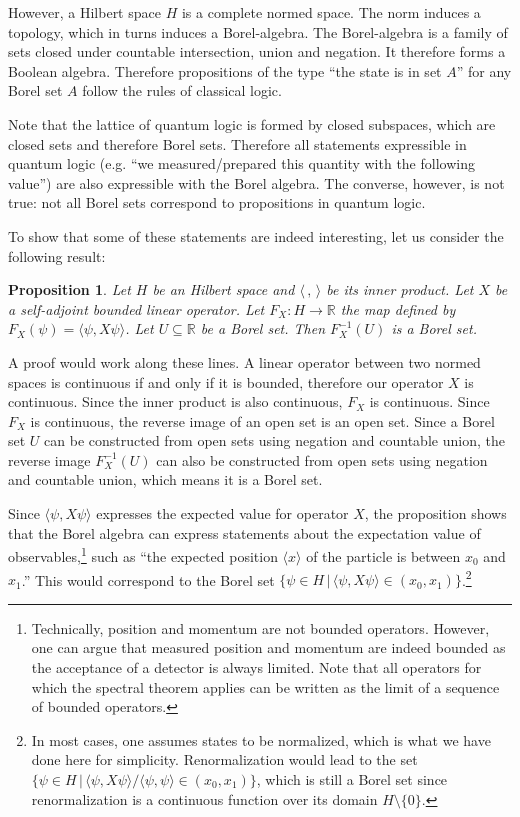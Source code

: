 \documentclass[10pt,twocolumn, nofootinbib]{revtex4-1}
\newtheorem{prop}[equation]{Proposition}
\begin{document}
However, a Hilbert space $H$ is a complete normed space. The norm induces a topology, which in turns induces a Borel-algebra. The Borel-algebra is a family of sets closed under countable intersection, union and negation. It therefore forms a Boolean algebra. Therefore propositions of the type ``the state is in set $A$'' for any Borel set $A$ follow the rules of classical logic.

Note that the lattice of quantum logic is formed by closed subspaces, which are closed sets and therefore Borel sets. Therefore all statements expressible in quantum logic (e.g. ``we measured/prepared this quantity with the following value'') are also expressible with the Borel algebra. The converse, however, is not true: not all Borel sets correspond to propositions in quantum logic.

To show that some of these statements are indeed interesting, let us consider the following result:
\begin{prop}
	Let $H$ be an Hilbert space and $\langle \, , \, \rangle$ be its inner product. Let $X$ be a self-adjoint bounded linear operator. Let $F_X : H \to \mathbb{R}$ the map defined by $F_X(\psi) = \langle \psi , X \psi \rangle$. Let $U \subseteq \mathbb{R}$ be a Borel set. Then $F_X^{-1}(U)$ is a Borel set.
\end{prop}

A proof would work along these lines. A linear operator between two normed spaces is continuous if and only if it is bounded, therefore our operator $X$ is continuous. Since the inner product is also continuous, $F_X$ is continuous. Since $F_X$ is continuous, the reverse image of an open set is an open set. Since a Borel set $U$ can be constructed from open sets using negation and countable union, the reverse image $F_X^{-1}(U)$ can also be constructed from open sets using negation and countable union, which means it is a Borel set.

Since $\langle \psi , X \psi \rangle$ expresses the expected value for operator $X$, the proposition shows that the Borel algebra can express statements about the expectation value of observables,\footnote{Technically, position and momentum are not bounded operators. However, one can argue that measured position and momentum are indeed bounded as the acceptance of a detector is always limited. Note that all operators for which the spectral theorem applies can be written as the limit of a sequence of bounded operators.} such as ``the expected position $\langle x \rangle$ of the particle is between $x_0$ and $x_1$.'' This would correspond to the Borel set $\{ \psi \in H \, | \, \langle \psi , X \psi \rangle \in (x_0, x_1) \}$.\footnote{In most cases, one assumes states to be normalized, which is what we have done here for simplicity. Renormalization would lead to the set $\{ \psi \in H \, | \, \langle \psi , X \psi \rangle / \langle \psi , \psi \rangle \in (x_0, x_1) \}$, which is still a Borel set since renormalization is a continuous function over its domain $H \setminus \{ 0 \}$.}
\end{document}
